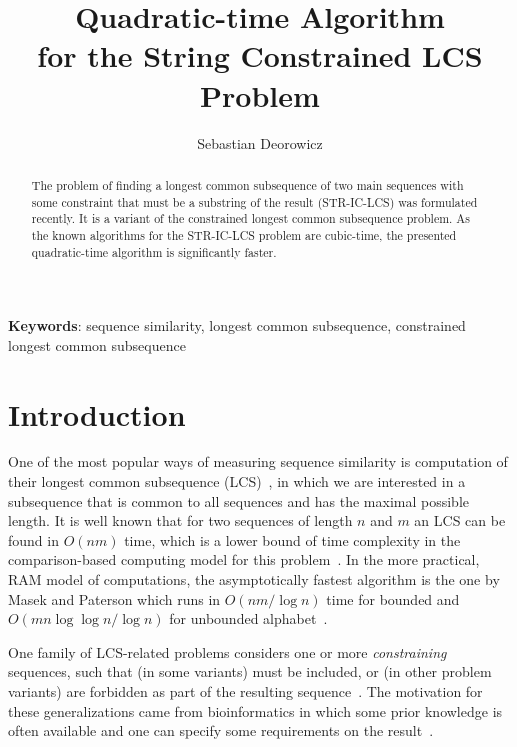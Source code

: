 \documentclass[12pt]{article}
\title{Quadratic-time Algorithm\\for the String Constrained LCS Problem}
\author{Sebastian Deorowicz}
\begin{document}
\maketitle

\begin{abstract}
The problem of finding a longest common subsequence of two main sequences with some constraint that must be a substring of the result (STR-IC-LCS) was formulated recently.
It is a variant of the constrained longest common subsequence problem.
As the known algorithms for the STR-IC-LCS problem are cubic-time, the presented quadratic-time algorithm is significantly faster.
\end{abstract}

{\bfseries Keywords}: sequence similarity, longest common subsequence, constrained longest common subsequence

\section{Introduction}

One of the most popular ways of measuring sequence similarity is computation of their longest common subsequence (LCS)~\cite{Gus1997}, in which we are interested in a subsequence that is common to all sequences and has the maximal possible length.
It is well known that for two sequences of length $n$ and $m$ an LCS can be found in $O(nm)$ time, which is a lower bound of time complexity in the comparison-based computing model for this problem~\cite{AHU1976}.
In the more practical, RAM model of computations, the asymptotically fastest algorithm is the one by Masek and Paterson which runs in $O(nm/\log n)$ time for bounded and $O(mn \log\log n / \log n)$ for unbounded alphabet~\cite{MP1980}.

One family of LCS-related problems considers one or more {\em constraining} sequences, such that (in some variants) must be included, or (in other problem variants) are forbidden as part of the resulting sequence~\cite{CC2011,Tsa2003}.
The motivation for these generalizations came from bioinformatics in which some prior knowledge is often available and one can specify some requirements on the result~\cite{Tsa2003,Deo2010a}.
\end{document}
